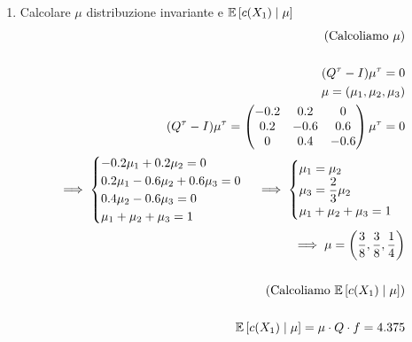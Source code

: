 \begin{exrc}
\begin{enumerate}
	\item Calcolare $\mu$ distribuzione invariante e $\mathbb{E}\left[c(X_1) \mid \mu\right]$
\begin{equation*}
	\begin{aligned}
	(\text{Calcoliamo } \mu )\\ \\
	(Q^\tau - I) \mu^\tau = 0 \\
	\mu = (\mu_1, \mu_2, \mu_3) \\
	(Q^\tau - I)\mu^\tau = \begin{pmatrix}
	-0.2 & 0.2 & 0 \\ 
	0.2 & -0.6 & 0.6 \\
	0 & 0.4 & -0.6
	\end{pmatrix} \mu^\tau = 0 \\
	\implies \begin{cases}
	-0.2 \mu_1 + 0.2 \mu_2 = 0 \\
	0.2 \mu_1 - 0.6 \mu_2 + 0.6 \mu_3 = 0 \\
	 0.4 \mu_2 - 0.6 \mu_3 = 0 \\
	 \mu_1 + \mu_2 + \mu_3 = 1
	\end{cases} 
	\implies \begin{cases}
	\mu_1 = \mu_2 \\
	\mu_3 = \dfrac{2}{3} \mu_2 \\
 	\mu_1 + \mu_2 + \mu_3 = 1
	\end{cases} \\
	\implies \mu = \left(\dfrac{3}{8}, \dfrac{3}{8}, \dfrac{1}{4}\right) \\ \\
	(\text{Calcoliamo } \mathbb{E}\left[c(X_1) \mid \mu\right]) \\ \\
	\mathbb{E}\left[c(X_1) \mid \mu\right] = \mu \cdot Q \cdot f =4.375
		\end{aligned} 
\end{equation*}
\end{enumerate}
\end{exrc}

